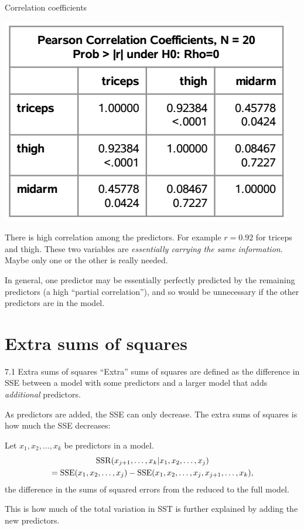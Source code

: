 \documentclass{beamer}
\begin{document}
\begin{frame}{Correlation coefficients}
\begin{center}
\includegraphics[scale=0.3]{plots/corr-matrix}
\end{center}

\pause There is high correlation among the predictors. \pause For example
$r = 0.92$ for triceps and thigh. These two variables are \textit{essentially
carrying the same information}. \pause Maybe only one or the other is really needed.
\vspace{10pt}

\pause In general, one predictor may be essentially perfectly predicted by
the remaining predictors (a high ``partial correlation''), and so would be unnecessary if the other predictors are in the model.
\end{frame}

\section{Extra sums of squares}

\begin{frame}{7.1 Extra sums of squares}
``Extra'' sums of squares are defined as the difference in SSE
between a model with some predictors and a larger model that
adds \textit{additional} predictors.
\vspace{10pt}

\pause {} As predictors are added, the SSE can only decrease. \pause The
extra sums of squares is how much the SSE decreases:


\pause \begin{definition} Let $x_1, x_2, \ldots, x_k$ be predictors in a model.
\begin{multline}
{\rm SSR}(x_{j+1}, \ldots, x_k | x_1, x_2, \ldots, x_j) \\= {\rm SSE}(x_1, x_2, \ldots, x_j) - {\rm SSE}(x_1, x_2, \ldots, x_j, x_{j+1}, \ldots, x_k),
\end{multline}
\pause the difference in the sums of squared errors from the reduced to the full model.
\end{definition}

\pause This is how much of the total variation in SST is further explained by adding the new predictors.
\end{frame}
\end{document}
